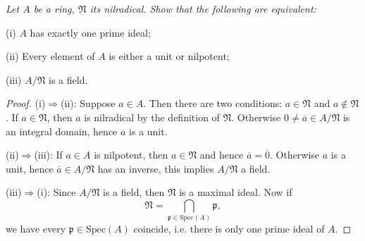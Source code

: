 \begin{problem}\em
Let $A$ be a ring, $\mathfrak{N}$ its nilradical. Show that the following are equivalent: \par
(i) $A$ has exactly one prime ideal;\par
(ii) Every element of $A$ is either a unit or nilpotent;\par
(iii) $A/\mathfrak{N}$ is a field.
\end{problem}
\begin{proof}
(i)$\Rightarrow$(ii): Suppose $a\in A$. Then there are two conditions: $a\in\mathfrak{N}$ and $a\notin\mathfrak{N}$. If $a\in\mathfrak{N}$, then $a$ is nilradical by the definition of $\mathfrak{N}$. Otherwise $0\ne\overline{a}\in A/\mathfrak{N}$ is an integral domain, hence $a$ is a unit.\par
(ii)$\Rightarrow$(iii): If $a\in A$ is nilpotent, then $a\in\mathfrak{N}$ and hence $\overline{a}=\overline{0}$. Otherwise $a$ is a unit, hence $\overline{a}\in A/\mathfrak{N}$ has an inverse, this implies $A/\mathfrak{N}$ a field.\par
(iii)$\Rightarrow$(i): Since $A/\mathfrak{N}$ is a field, then $\mathfrak{N}$ is a maximal ideal. Now if 
$$
\mathfrak{N} =\bigcap_{\mathfrak{p} \in \mathrm{Spec}\left( A \right)}{\mathfrak{p}},
$$
we have every $\mathfrak{p}\in\mathrm{Spec}(A)$ coincide, i.e. there is only one prime ideal of $A$.
\end{proof}
